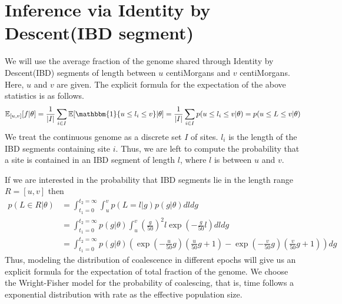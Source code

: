 \documentclass[12pt]{article}
\theoremstyle{definition}
\theoremstyle{definition}
\theoremstyle{lemma}
\theoremstyle{remark}
\theoremstyle{definition}
\begin{document}
\section{Inference via Identity by Descent(IBD segment)}\label{sec:ibd}
We will use the average fraction of the genome shared through Identity by Descent(IBD) segments of length between $u$ centiMorgans and  $v$ centiMorgans. Here, $u$ and $v$ are given. The explicit formula for the expectation of the above statistics is as follows. \begin{equation}\label{eq:expectation_fraction}
    \mathbb{E}_{[u,v]}[f|\theta] =\frac{1}{|I|}\sum_{i\in I}\mathbb{E}[\mathbbm{1}\{u\leq l_i\leq v\}|\theta]= \frac{1}{|I|}\sum_{i\in I}p(u\leq l_i\leq v|
\theta) = p(u\leq L\leq v|\theta)
\end{equation}
We treat the continuous genome as a discrete set $I$ of sites. $l_i$ is the length of the IBD segments containing site $i$. Thus, we are left to compute the probability that a site is contained in an IBD segment of length $l$, where $l$ is between $u$ and $v$.

If we are interested in the probability that IBD segments lie in the length range $R=[u,v]$ then \begin{align*}
    p(L\in R|\theta) &= \int_{t_1=0}^{t_2=\infty}\int_u^v p(L=l|g)p(g|\theta) dl dg\\
    &= \int_{t_1=0}^{t_2=\infty} p(g|\theta)\int_u^v (\frac{g}{50})^2l\exp(-\frac{g}{50}l)dl dg\\
    &= \int_{t_1=0}^{t_2=\infty} p(g|\theta) \left(\exp(-\frac{u}{50}g)(\frac{u}{50}g+1) - \exp(-\frac{v}{50}g)(\frac{v}{50}g+1)\right) dg
\end{align*}
Thus, modeling the distribution of coalescence in different epochs will give us an explicit formula for the expectation of total fraction of the genome. We choose the Wright-Fisher model for the probability of coalescing, that is, time follows a exponential distribution with rate as the effective population size.
\end{document}
